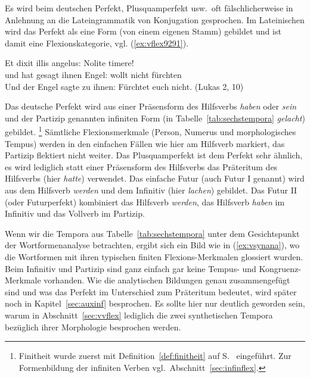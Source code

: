 Es wird beim deutschen Perfekt, Plusquamperfekt usw.\ oft fälschlicherweise in Anlehnung an die Lateingrammatik von Konjugation gesprochen.
Im Lateinischen wird \zB das Perfekt als eine Form (von einem eigenen Stamm) gebildet und ist damit eine Flexionskategorie, vgl. (\ref{ex:vflex9291}).

\begin{exe}
  \ex\label{ex:vflex9291}\gll Et dixit illis angelus: Nolite timere!\\
  und {hat gesagt} ihnen {Engel}: {wollt nicht} fürchten\\
  \glt Und der Engel sagte zu ihnen: Fürchtet euch nicht. (Lukas 2, 10)
\end{exe}


Das deutsche Perfekt wird aus einer Präsensform des Hilfsverbs \textit{haben} oder \textit{sein} und der Partizip genannten infiniten Form (in Tabelle~\ref{tab:sechstempora} \textit{gelacht}) gebildet.%
\footnote{Finitheit wurde zuerst mit Definition~\ref{def:finitheit} auf S.~\pageref{def:finitheit} eingeführt.
Zur Formenbildung der infiniten Verben vgl.\ Abschnitt~\ref{sec:infinflex}.}
Sämtliche Flexionsmerkmale (Person, Numerus und morphologisches Tempus) werden in den einfachen Fällen wie hier am Hilfsverb markiert, das Partizip flektiert nicht weiter.
Das Plusquamperfekt ist dem Perfekt sehr ähnlich, es wird lediglich statt einer Präsensform des Hilfsverbs das Präteritum des Hilfsverbs (hier \textit{hatte}) verwendet.
Das einfache Futur (auch Futur I genannt) wird aus dem Hilfsverb \textit{werden} und dem Infinitiv (hier \textit{lachen}) gebildet.
Das Futur II (oder Futurperfekt) kombiniert das Hilfsverb \textit{werden}, das Hilfsverb \textit{haben} im Infinitiv und das Vollverb im Partizip.

Wenn wir die Tempora aus Tabelle~\ref{tab:sechstempora} unter dem Gesichtspunkt der Wortformenanalyse betrachten, ergibt sich ein Bild wie in (\ref{ex:vsynana}), wo die Wortformen mit ihren typischen finiten Flexions-Merkmalen glossiert wurden.
Beim Infinitiv und Partizip sind ganz einfach gar keine Tempus- und Kongruenz-Merkmale vorhanden.
Wie die analytischen Bildungen genau zusammengefügt sind und was \zB das Perfekt im Unterschied zum Präteritum bedeutet, wird später noch in Kapitel~\ref{sec:auxinf} besprochen.
Es sollte hier nur deutlich geworden sein, warum in Abschnitt~\ref{sec:vvflex} lediglich die zwei synthetischen Tempora bezüglich ihrer Morphologie besprochen werden.

